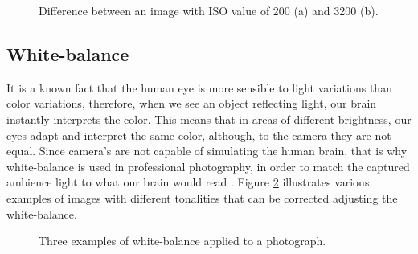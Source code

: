 
\begin{figure}[htbp]
        \centering
  \caption{Difference between an image with ISO value of 200 (a) and 3200 (b).}
  \label{fig:iso_example}
\end{figure}

\subsection{White-balance}
\label{sub:white_balance}

It is a known fact that the human eye is more sensible to light variations than color variations, therefore, when we see an object reflecting light, our brain instantly interprets the color. This means that in areas of different brightness, our eyes adapt and interpret the same color, although, to the camera they are not equal.
Since camera's are not capable of simulating the human brain, that is why white-balance is used in professional photography, in order to match the captured ambience light to what our brain would read \cite{Kamps2012}. Figure \ref{fig:white_balance_example} illustrates various examples of images with different tonalities that can be corrected adjusting the white-balance.

\begin{figure}[htbp]
        \centering
  \caption{Three examples of white-balance applied to a photograph. \cite{Kamps2012}}
  \label{fig:white_balance_example}
\end{figure}





